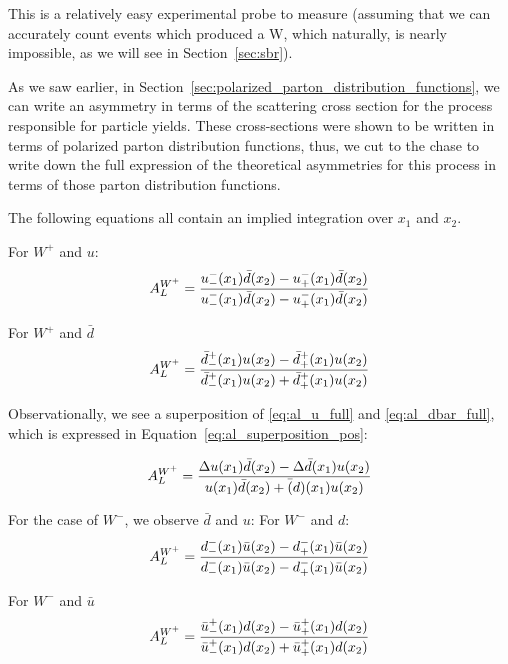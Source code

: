 This is a relatively easy experimental probe to measure (assuming that we can
accurately count events which produced a W, which naturally, is nearly
impossible, as we will see in Section~\ref{sec:sbr}).

As we saw earlier, in
Section~\ref{sec:polarized_parton_distribution_functions}, we can write an
asymmetry in terms of the scattering cross section for the process responsible
for particle yields. These cross-sections were shown to be written in terms of
polarized parton distribution functions, thus, we cut to the chase to write
down the full expression of the theoretical asymmetries for this process in
terms of those parton distribution functions.

The following equations all contain an implied integration over $x_1$ and $x_2$.

For $W^+$ and $u$:
\begin{equation}
  {A_L^{W^+}} = 
  {
    {u_-^-(x_1)\bar{d}(x_2)-u_+^-(x_1)\bar{d}(x_2)}
    \over
    {u_-^-(x_1)\bar{d}(x_2)-u_+^-(x_1)\bar{d}(x_2)}
  }  
  \label{eq:al_u_full}
\end{equation}

For $W^+$ and $\bar{d}$
\begin{equation}
  {A_L^{W^+}} = 
  {
    {\bar{d}_-^+(x_1)u(x_2)-\bar{d}_+^+(x_1)u(x_2)}
    \over
    {\bar{d}_-^+(x_1)u(x_2)+\bar{d}_+^+(x_1)u(x_2)}
  }  
  \label{eq:al_dbar_full}
\end{equation}

Observationally, we see a superposition of \ref{eq:al_u_full} and
\ref{eq:al_dbar_full}, which is expressed in
Equation~\ref{eq:al_superposition_pos}:

\begin{equation}
  {A_L^{W^+}} = 
  {
    {
      \Delta u(x_1)\bar{d}(x_2)-\Delta \bar{d}(x_1)u(x_2)
    }
    \over
    {
      u(x_1)\bar d(x_2)+\bar(d)(x_1)u(x_2)
    }
  }
  \label{eq:al_superposition_pos}
\end{equation}

For the case of $W^-$, we observe $\bar{d}$ and $u$:
For $W^-$ and $d$:
\begin{equation}
  {A_L^{W^+}} = 
  {
    {d_-^-(x_1)\bar{u}(x_2)-d_+^-(x_1)\bar{u}(x_2)}
    \over
    {d_-^-(x_1)\bar{u}(x_2)-d_+^-(x_1)\bar{u}(x_2)}
  }  
  \label{eq:al_d_full}
\end{equation}

For $W^-$ and $\bar{u}$
\begin{equation}
  {A_L^{W^+}} = 
  {
    {\bar{u}_-^+(x_1)d(x_2)-\bar{u}_+^+(x_1)d(x_2)}
    \over
    {\bar{u}_-^+(x_1)d(x_2)+\bar{u}_+^+(x_1)d(x_2)}
  }  
  \label{eq:al_ubar_full}
\end{equation}

